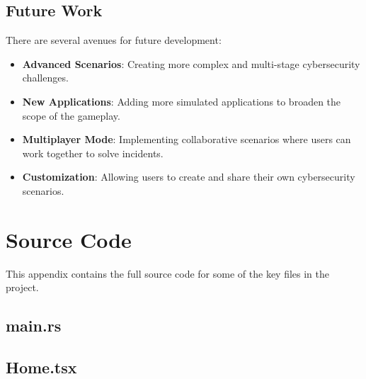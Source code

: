 \documentclass{report}
\begin{document}
\section{Future Work}
There are several avenues for future development:
\begin{itemize}
    \item \textbf{Advanced Scenarios}: Creating more complex and multi-stage cybersecurity challenges.
    \item \textbf{New Applications}: Adding more simulated applications to broaden the scope of the gameplay.
    \item \textbf{Multiplayer Mode}: Implementing collaborative scenarios where users can work together to solve incidents.
    \item \textbf{Customization}: Allowing users to create and share their own cybersecurity scenarios.
\end{itemize}

\appendix
\chapter{Source Code}
This appendix contains the full source code for some of the key files in the project.

\section{main.rs}


\section{Home.tsx}

\end{document}
